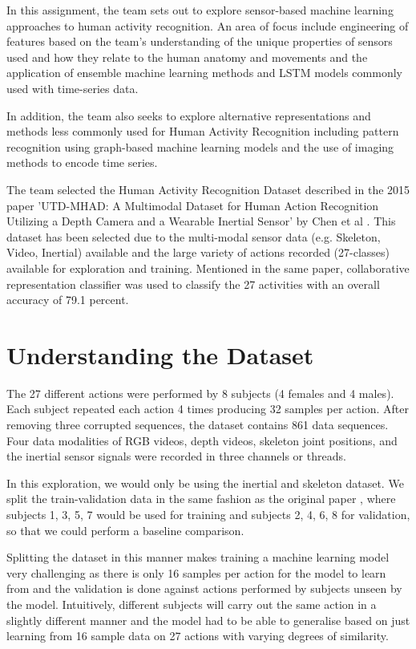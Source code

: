 \documentclass[conference]{IEEEtran}
\begin{document}
In this assignment, the team sets out to explore sensor-based machine learning approaches to human activity recognition. An area of focus include engineering of features based on the team's understanding of the unique properties of sensors used and how they relate to the human anatomy and movements and the application of ensemble machine learning methods and LSTM models commonly used with time-series data.

In addition, the team also seeks to explore alternative representations and methods less commonly used for Human Activity Recognition including pattern recognition using graph-based machine learning models and the use of imaging methods to encode time series.

The team selected the Human Activity Recognition Dataset described in the 2015 paper 'UTD-MHAD: A Multimodal Dataset for Human Action Recognition Utilizing a Depth Camera and a Wearable Inertial Sensor' by Chen et al \cite{UTD-MHAD}. This dataset has been selected due to the multi-modal sensor data (e.g. Skeleton, Video, Inertial) available and the large variety of actions recorded (27-classes) available for exploration and training. Mentioned in the same paper, collaborative representation classifier was used to classify the 27 activities with an overall accuracy of 79.1 percent.


\section{Understanding the Dataset}

The 27 different actions were performed by 8 subjects (4 females and 4 males). Each subject repeated each action 4 times producing 32 samples per action. After removing three corrupted sequences, the dataset contains 861 data sequences. Four data modalities of RGB videos, depth videos, skeleton joint positions, and the inertial sensor signals were recorded in three channels or threads.

In this exploration, we would only be using the inertial
and skeleton dataset. We split the
train-validation data in the same fashion as the original
paper \cite{UTD-MHAD}, where subjects 1, 3, 5, 7 would be
used for training and subjects 2, 4, 6, 8 for validation,
so that we could perform a baseline comparison.

Splitting the dataset in this manner makes training a machine learning model very challenging as there is only 16 samples per action for the model to learn from and the validation is done against actions performed by subjects unseen by the model. Intuitively, different subjects will carry out the same action in a slightly different manner and the model had to be able to generalise based on just learning from 16 sample data on 27 actions with varying degrees of similarity.  
\end{document}
